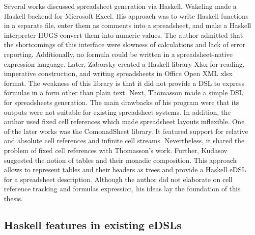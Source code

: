 Several works discussed spreadsheet generation via Haskell.
Wakeling \cite{wakeling_spreadsheet_2007} made a Haskell backend for Microsoft Excel. His approach was to write Haskell functions in a separate file, enter them as comments into a spreadsheet, and make a Haskell interpreter HUGS convert them into numeric values. The author admitted that the shortcomings of this interface were slowness of calculations and lack of error reporting. Additionally, no formula could be written in a spreadsheet-native expression language. Later, Zaborsky created a Haskell library Xlsx \cite{github_xlsx} for reading, imperative construction, and writing spreadsheets in Office Open XML xlsx format. The weakness of this library is that it did not provide a DSL to express formulas in a form other than plain text. Next, Thomasson \cite{github_hcalc} made a simple DSL for spreadsheets generation. The main drawbacks of his program were that its outputs were not suitable for existing spreadsheet systems. In addition, the author used fixed cell references which made spreadsheet layouts inflexible. One of the later works was the ComonadSheet \cite{github_comonadsheet} library. It featured support for relative and absolute cell references and infinite cell streams. Nevertheless, it shared the problem of fixed cell references with Thomasson's work. Further, Kudasov \cite{youtube_kudasov} suggested the notion of tables and their monadic composition. This approach allows to represent tables and their headers as trees and provide a Haskell eDSL for a spreadsheet description. Although the author did not elaborate on cell reference tracking and formulas expression, his ideas lay the foundation of this thesis.

\subsection{Haskell features in existing eDSLs}

